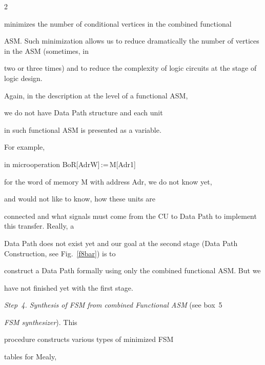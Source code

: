 \begin{multicols}{2}


\noindent


minimizes the number of conditional vertices in the combined functional


ASM. Such minimization allows us to reduce dramatically the number of vertices in the ASM (sometimes, in


two or three times) and to reduce the complexity of logic circuits at the stage of logic design.


{





}


 


 Again, in the description at the level of a functional ASM,


we do not have Data Path structure and each unit


in such functional ASM is presented as a variable. 


For example,


in microoperation BoR[AdrW]\,:=\,M[Adr1]


for the word of memory M with address Adr, we do not know yet,


and would not like to know, how these units are


connected and what signals must come from the CU to Data Path to implement this transfer. Really, a


Data Path does not exist yet and our goal at the second stage (Data Path Construction, see Fig.~\ref{f8bar}) is to


construct a Data Path formally using only the combined functional ASM. But we


have not finished yet with the first stage.


{%





}








\textit{Step~4. Synthesis of FSM from combined Functional ASM} (see box~5


\textit{FSM synthesizer}). This


procedure constructs various types of minimized FSM


tables for Mealy,



\end{multicols}
